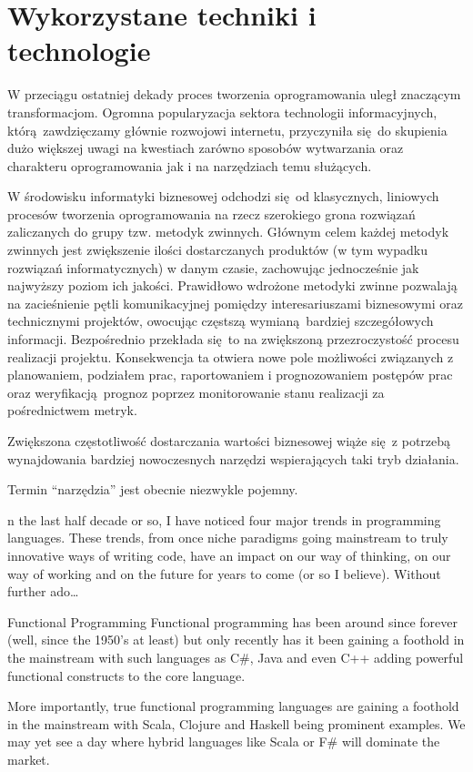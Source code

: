 \section{Wykorzystane techniki i technologie}\label{ss_internals-technologies}
W przeciągu ostatniej dekady proces tworzenia oprogramowania uległ znaczącym
transformacjom.
Ogromna popularyzacja sektora technologii informacyjnych, którą zawdzięczamy
głównie rozwojowi internetu, przyczyniła się do skupienia dużo większej uwagi na
kwestiach zarówno sposobów wytwarzania oraz charakteru oprogramowania jak i na
narzędziach temu służących.

W środowisku informatyki biznesowej odchodzi się od klasycznych, liniowych
procesów tworzenia oprogramowania na rzecz szerokiego grona rozwiązań 
zaliczanych do grupy tzw. metodyk zwinnych. 
Głównym celem każdej metodyk zwinnych jest zwiększenie ilości dostarczanych 
produktów (w tym wypadku rozwiązań informatycznych) w danym czasie, zachowując 
jednocześnie jak najwyższy poziom ich jakości.
Prawidłowo wdrożone metodyki zwinne pozwalają na zacieśnienie pętli
komunikacyjnej pomiędzy interesariuszami biznesowymi oraz technicznymi projektów,
owocując częstszą wymianą bardziej szczegółowych informacji.
Bezpośrednio przekłada się to na zwiększoną przezroczystość procesu realizacji projektu.
Konsekwencja ta otwiera nowe pole możliwości związanych z planowaniem, podziałem prac,
raportowaniem i prognozowaniem postępów prac oraz weryfikacją prognoz poprzez 
monitorowanie stanu realizacji za pośrednictwem metryk.

Zwiększona częstotliwość dostarczania wartości biznesowej wiąże się z potrzebą
wynajdowania bardziej nowoczesnych narzędzi wspierających taki tryb działania.

Termin ``narzędzia'' jest obecnie niezwykle pojemny.

n the last half decade or so, I have noticed four major trends in programming languages. These trends, from once niche paradigms going mainstream to truly innovative ways of writing code, have an impact on our way of thinking, on our way of working and on the future for years to come (or so I believe). Without further ado…

Functional Programming
Functional programming has been around since forever (well, since the 1950's at least) but only recently has it been gaining a foothold in the mainstream with such languages as C#, Java and even C++ adding powerful functional constructs to the core language.

More importantly, true functional programming languages are gaining a foothold in the mainstream with Scala, Clojure and Haskell being prominent examples. We may yet see a day where hybrid languages like Scala or F# will dominate the market.

